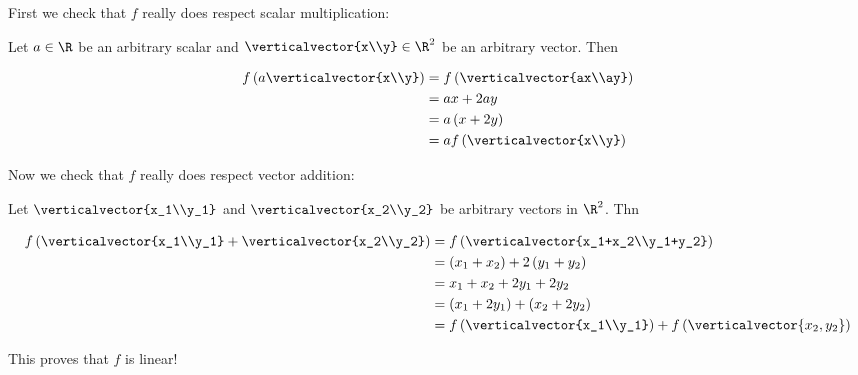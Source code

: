 \documentclass{ximera}
\begin{document}
\begin{question}
\begin{solution}
\begin{hint}
\begin{question}
        	First we check that $f$ really does respect scalar multiplication:
		
        	Let $a \in \R$ be an arbitrary scalar and $\verticalvector{x\\y} \in \R^2$ be an arbitrary vector.  Then
		
        	\begin{align*}
        	 f\left(a\verticalvector{x\\y}\right) &= f\left(\verticalvector{ax\\ay}\right)\\
        	 &= ax+2ay\\
        	 &= a\left(x+2y\right)\\
        	 &=af\left(\verticalvector{x\\y}\right) 		
        	 \end{align*}
		 
        	 Now we check that $f$ really does respect vector addition:
		 
        	 Let $\verticalvector{x_1\\y_1}$ and $\verticalvector{x_2\\y_2}$ be arbitrary vectors in $\R^2$.  Thn
		 
        	 \begin{align*}
        	 f\left(\verticalvector{x_1\\y_1}+\verticalvector{x_2\\y_2}\right)&= f\left(\verticalvector{x_1+x_2\\y_1+y_2}\right)\\
        	 &= \left(x_1+x_2\right)+2\left(y_1+y_2\right)\\
        	 &= x_1+x_2+2y_1+2y_2\\
        	 &=\left(x_1+2y_1\right)+\left(x_2+2y_2\right)\\
        	 &=f\left(\verticalvector{x_1\\y_1}\right)+f\left(\verticalvector{x_2,y_2}\right)
        	 \end{align*}
		 
        	 This proves that $f$ is linear!
		
        \end{question}
	
    \end{hint}

    \begin{multiple-choice}


\end{multiple-choice}
\end{solution}
\end{question}
\end{document}
